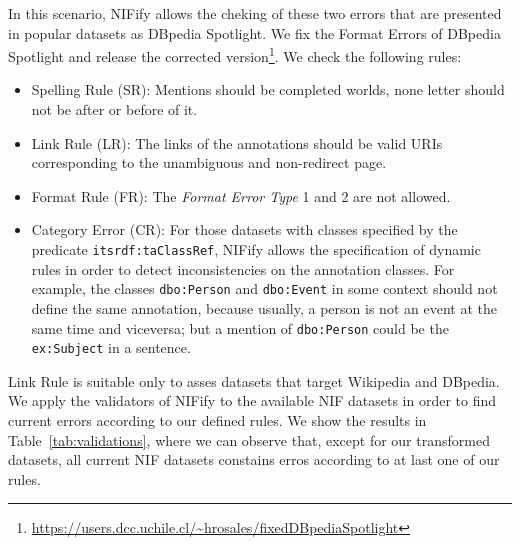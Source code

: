 \documentclass{llncs}
\begin{document}
In this scenario, NIFify allows the cheking of these two errors that are presented in popular datasets as DBpedia Spotlight. We fix the Format Errors of DBpedia Spotlight and release the corrected version\footnote{\url{https://users.dcc.uchile.cl/~hrosales/fixedDBpediaSpotlight}}. We check the following rules:

\begin{itemize} 
\item Spelling Rule (SR): Mentions should be completed worlds, none letter should not be after or before of it.
\item Link Rule (LR): The links of the annotations should be valid URIs corresponding to the unambiguous and non-redirect page.
\item Format Rule (FR): The \textit{Format Error Type} 1 and 2 are not allowed.
\item Category Error (CR): For those datasets with classes specified by the predicate \texttt{itsrdf:taClassRef}, NIFify allows the specification of dynamic rules in order to detect inconsistencies on the annotation classes. For example, the classes \texttt{dbo:Person} and \texttt{dbo:Event} in some context should not define the same annotation, because usually, a person is not an event at the same time and viceversa; but a mention of \texttt{dbo:Person} could be the \texttt{ex:Subject} in a sentence. 
\end{itemize}

%
%
%
%
%
%
Link Rule is suitable only to asses datasets that target Wikipedia and DBpedia. We apply the validators of NIFify to the available NIF datasets in order to find current errors according to our defined rules. We show the results in Table~\ref{tab:validations}, where we can observe that, except for our transformed datasets, all current NIF datasets constains erros according to at last one of our rules.
\end{document}
